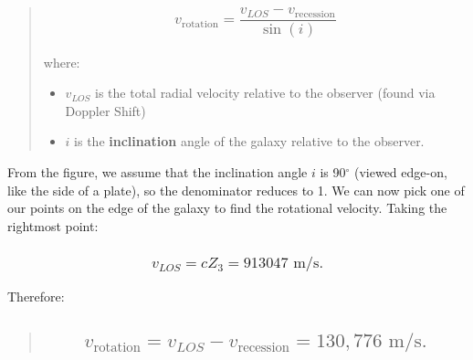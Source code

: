 \documentclass[
]{article}
\providecommand{\tightlist}{%
  \setlength{\itemsep}{0pt}\setlength{\parskip}{0pt}}
\begin{document}
\begin{quote}
\hypertarget{v_textrotation-fracv_los---v_textrecessionsini}{%
\subsubsection{\texorpdfstring{{\[v_{\text{rotation}} = \frac{v_{LOS} - v_{\text{recession}}}{\sin(i)}\]}}{v\_\{\textbackslash text\{rotation\}\} = \textbackslash frac\{v\_\{LOS\} - v\_\{\textbackslash text\{recession\}\}\}\{\textbackslash sin(i)\}}}\label{v_textrotation-fracv_los---v_textrecessionsini}}

where:

\begin{itemize}
\tightlist
\item
  {\(v_{LOS}\)} is the total radial velocity relative to the observer
  (found via Doppler Shift)
\item
  {\(i\)} is the \textbf{inclination} angle of the galaxy relative to
  the observer.
\end{itemize}
\end{quote}

From the figure, we assume that the inclination angle {\(i\)} is
90{\({^\circ}\)} (viewed edge-on, like the side of a plate), so the
denominator reduces to 1. We can now pick one of our points on the edge
of the galaxy to find the rotational velocity. Taking the rightmost
point:

\hypertarget{v_los-cz_3-913047textms.}{%
\subsubsection{\texorpdfstring{{\[v_{LOS} = cZ_{3} = 913047\text{~m/s.}\]}}{v\_\{LOS\} = cZ\_\{3\} = 913047\textbackslash text\{\textasciitilde m/s.\}}}\label{v_los-cz_3-913047textms.}}

Therefore:

\begin{quote}
\hypertarget{v_textrotation-v_los---v_textrecession-130776textms.}{%
\subsection{\texorpdfstring{{\[v_{\text{rotation}} = v_{LOS} - v_{\text{recession}} = 130,776\text{~m/s}.\]}}{v\_\{\textbackslash text\{rotation\}\} = v\_\{LOS\} - v\_\{\textbackslash text\{recession\}\} = 130,776\textbackslash text\{\textasciitilde m/s\}.}}\label{v_textrotation-v_los---v_textrecession-130776textms.}}
\end{quote}
\end{document}
